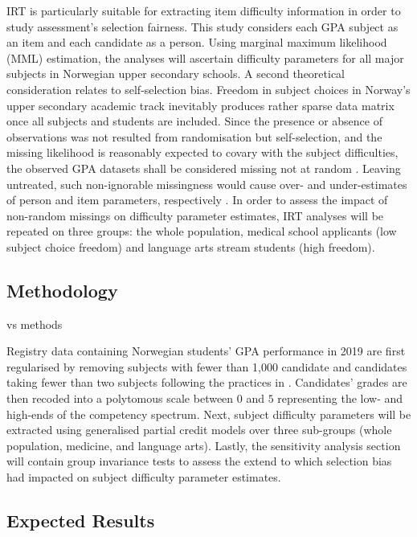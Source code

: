 IRT is particularly suitable for extracting item difficulty information in order to study assessment's selection fairness. This study considers each GPA subject as an item and each candidate as a person. Using marginal maximum likelihood (MML) estimation, the analyses will ascertain difficulty parameters for all major subjects in Norwegian upper secondary schools. A second theoretical consideration relates to self-selection bias. Freedom in subject choices in Norway's upper secondary academic track inevitably produces rather sparse data matrix once all subjects and students are included. Since the presence or absence of observations was not resulted from randomisation but self-selection, and the missing likelihood is reasonably expected to covary with the subject difficulties, the observed GPA datasets shall be considered missing not at random \parencite[MNAR,][]{rubin:1976}. Leaving untreated, such non-ignorable missingness would cause over- and under-estimates of person and item parameters, respectively \parencite{rose:2013}. In order to assess the impact of non-random missings on difficulty parameter estimates, IRT analyses will be repeated on three groups: the whole population, medical school applicants (low subject choice freedom) and language arts stream students (high freedom).

\subsection{Methodology}

vs methods

Registry data containing Norwegian students' GPA performance in 2019 are first regularised by removing subjects with fewer than 1,000 candidate and candidates taking fewer than two subjects following the practices in \textcite{he:2018}. Candidates' grades are then recoded into a polytomous scale between $0$ and $5$ representing the low- and high-ends of the competency spectrum. Next, subject difficulty parameters will be extracted using generalised partial credit models \parencite[GPCM,][]{muraki:1992} over three sub-groups (whole population, medicine, and language arts). Lastly, the sensitivity analysis section will contain group invariance tests to assess the extend to which selection bias had impacted on subject difficulty parameter estimates.

\subsection{Expected Results}

